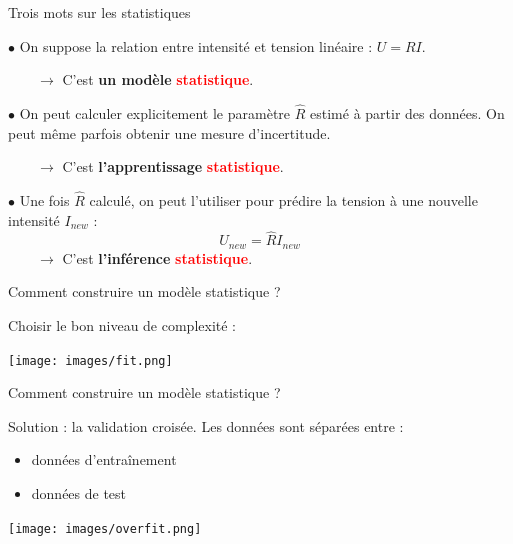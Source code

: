 \documentclass{beamer}
\begin{document}
\begin{frame}{Trois mots sur les statistiques}

$\bullet$ On suppose la relation entre intensité et tension linéaire : $U = R I$.

$\hspace{2em} \rightarrow$ C'est \textbf{un modèle} \textcolor{red}{\textbf{statistique}}.

\vspace{2em}

$\bullet$ On peut calculer explicitement le paramètre $\hat R$ estimé à partir des données. On peut même parfois obtenir une mesure d'incertitude.

$\hspace{2em} \rightarrow$ C'est \textbf{l'apprentissage} \textcolor{red}{\textbf{statistique}}.

\vspace{2em}

$\bullet$ Une fois $\hat R$ calculé, on peut l'utiliser pour prédire la tension à une nouvelle intensité $I_{new}$ : $$U_{new} = \hat R I_{new} $$
$\hspace{2em} \rightarrow$ C'est \textbf{l'inférence} \textcolor{red}{\textbf{statistique}}. 

\end{frame}


\begin{frame}{Comment construire un modèle statistique ?}

Choisir le bon niveau de complexité :

\texttt{[image: images/fit.png]} 

\end{frame}

\begin{frame}{Comment construire un modèle statistique ?}

Solution : la validation croisée. Les données sont séparées entre :
\begin{itemize}
\item données d'entraînement
\item données de test
\end{itemize}

\texttt{[image: images/overfit.png]} 

\end{frame}
\end{document}
